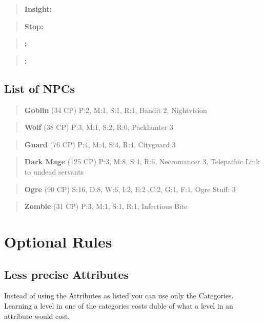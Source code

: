\documentclass[11pt]{article}
\begin{document}
{\begin{multicols}{2}[]
\begin{quote}
\textbf{Insight:} 
\end{quote}

\begin{quote}
\textbf{Stop:} 
\end{quote}

\begin{quote}
\textbf{:} 
\end{quote}

\begin{quote}
\textbf{:} 
\end{quote}


\subsection{List of NPCs}
\label{sec:orgc298d95}
\begin{quote}
\textbf{Goblin} (34 CP)
P:2, M:1, S:1, R:1, Bandit 2, Nightvision
\end{quote}

\begin{quote}
\textbf{Wolf} (38 CP)
P:3, M:1, S:2, R:0, Packhunter 3
\end{quote}

\begin{quote}
\textbf{Guard} (76 CP)
P:4, M:4, S:4, R:4, Cityguard 3
\end{quote}

\begin{quote}
\textbf{Dark Mage} (125 CP)
P:3, M:8, S:4, R:6, Necromancer 3, Telepathic Link to undead servants
\end{quote}

\begin{quote}
\textbf{Ogre} (90 CP)
S:16, D:8, W:6, I:2, E:2 ,C:2, G:1, F:1, Ogre Stuff: 3
\end{quote}

\begin{quote}
\textbf{Zombie} (31 CP)
P:3, M:1, S:1, R:1, Infectious Bite
\end{quote}

\newpage
\section{Optional Rules}
\label{sec:orgd9d1b37}

\subsection{Less precise Attributes}
\label{sec:org988981a}
Instead of using the Attributes as listed you can use only the Categories. Learning a level in one of the categories costs duble of what a level in an attribute would cost.


\end{multicols}}
\end{document}
